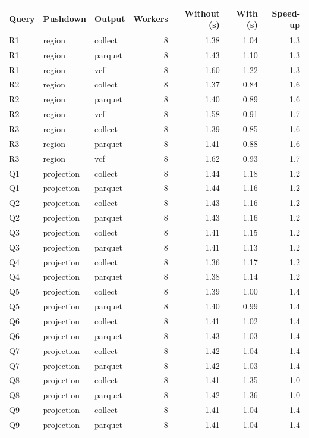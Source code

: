 \begin{tabular}{lllrrrr}
\toprule
Query & Pushdown & Output & Workers & Without (s) & With (s) & Speed-up \\
\midrule
R1 & region & collect & 8 & 1.38 & 1.04 & 1.3 \\
R1 & region & parquet & 8 & 1.43 & 1.10 & 1.3 \\
R1 & region & vcf & 8 & 1.60 & 1.22 & 1.3 \\
R2 & region & collect & 8 & 1.37 & 0.84 & 1.6 \\
R2 & region & parquet & 8 & 1.40 & 0.89 & 1.6 \\
R2 & region & vcf & 8 & 1.58 & 0.91 & 1.7 \\
R3 & region & collect & 8 & 1.39 & 0.85 & 1.6 \\
R3 & region & parquet & 8 & 1.41 & 0.88 & 1.6 \\
R3 & region & vcf & 8 & 1.62 & 0.93 & 1.7 \\
Q1 & projection & collect & 8 & 1.44 & 1.18 & 1.2 \\
Q1 & projection & parquet & 8 & 1.44 & 1.16 & 1.2 \\
Q2 & projection & collect & 8 & 1.43 & 1.16 & 1.2 \\
Q2 & projection & parquet & 8 & 1.43 & 1.16 & 1.2 \\
Q3 & projection & collect & 8 & 1.41 & 1.15 & 1.2 \\
Q3 & projection & parquet & 8 & 1.41 & 1.13 & 1.2 \\
Q4 & projection & collect & 8 & 1.36 & 1.17 & 1.2 \\
Q4 & projection & parquet & 8 & 1.38 & 1.14 & 1.2 \\
Q5 & projection & collect & 8 & 1.39 & 1.00 & 1.4 \\
Q5 & projection & parquet & 8 & 1.40 & 0.99 & 1.4 \\
Q6 & projection & collect & 8 & 1.41 & 1.02 & 1.4 \\
Q6 & projection & parquet & 8 & 1.43 & 1.03 & 1.4 \\
Q7 & projection & collect & 8 & 1.42 & 1.04 & 1.4 \\
Q7 & projection & parquet & 8 & 1.42 & 1.03 & 1.4 \\
Q8 & projection & collect & 8 & 1.41 & 1.35 & 1.0 \\
Q8 & projection & parquet & 8 & 1.42 & 1.36 & 1.0 \\
Q9 & projection & collect & 8 & 1.41 & 1.04 & 1.4 \\
Q9 & projection & parquet & 8 & 1.41 & 1.04 & 1.4 \\

\end{tabular}
